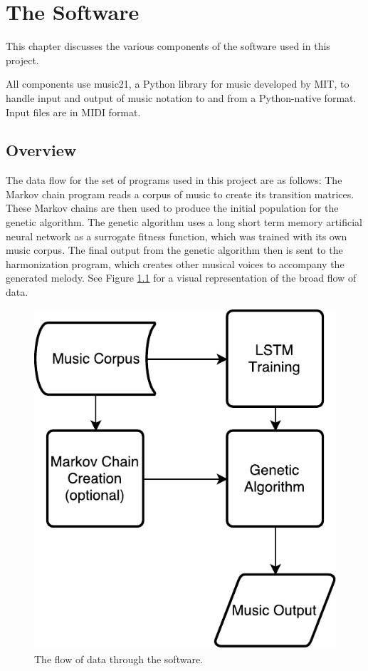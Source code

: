 \chapter{The Software} \label{software}

This chapter discusses the various components of the software used in this project.

All components use music21, a Python library for music developed by MIT, to handle input and output of music notation to and from a Python-native format.
Input files are in MIDI format.

\section{Overview} \label{software:overview}

The data flow for the set of programs used in this project are as follows:
The Markov chain program reads a corpus of music to create its transition matrices.
These Markov chains are then used to produce the initial population for the genetic algorithm.
The genetic algorithm uses a long short term memory artificial neural network as a surrogate fitness function, which was trained with its own music corpus.
The final output from the genetic algorithm then is sent to the harmonization program, which creates other musical voices to accompany the generated melody.
See Figure \ref{fig:softwareoverview} for a visual representation of the broad flow of data.

\begin{figure}[h]
	\centering
	\includegraphics{figures/overview_flowchart.pdf}
	\caption{The flow of data through the software.}
	\label{fig:softwareoverview}
\end{figure}

